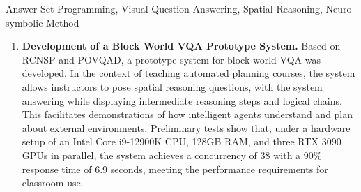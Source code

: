 \begin{englishabstract}{Answer Set Programming, Visual Question Answering, Spatial Reasoning, Neuro-symbolic Method}
\begin{enumerate}[itemsep=0pt]
\item \textbf{Development of a Block World VQA Prototype System.} Based on RCNSP and POVQAD, a prototype system for block world VQA was developed. In the context of teaching automated planning courses, the system allows instructors to pose spatial reasoning questions, with the system answering while displaying intermediate reasoning steps and logical chains. This facilitates demonstrations of how intelligent agents understand and plan about external environments. Preliminary tests show that, under a hardware setup of an Intel Core i9-12900K CPU, 128GB RAM, and three RTX 3090 GPUs in parallel, the system achieves a concurrency of 38 with a 90\% response time of 6.9 seconds, meeting the performance requirements for classroom use.
\end{enumerate}
\end{englishabstract}

\tableofcontents
\listofothers
